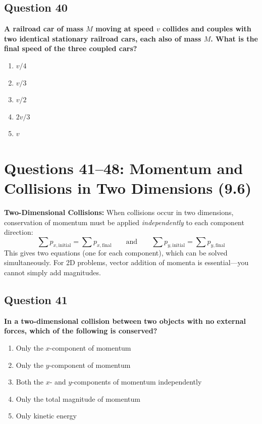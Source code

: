 \documentclass[12pt,letterpaper]{article}
\begin{document}
\subsection{Question 40}

\begin{questionbox}
\textbf{A railroad car of mass $M$ moving at speed $v$ collides and couples with two identical stationary railroad cars, each also of mass $M$. What is the final speed of the three coupled cars?}

\begin{enumerate}[label=\alph*)]
    \item $v/4$
    \item $v/3$
    \item $v/2$
    \item $2v/3$
    \item $v$
\end{enumerate}
\end{questionbox}

\section{Questions 41--48: Momentum and Collisions in Two Dimensions (9.6)}

\begin{conceptbox}
\textbf{Two-Dimensional Collisions:} When collisions occur in two dimensions, conservation of momentum must be applied \emph{independently} to each component direction:
\[
\sum p_{x,\text{initial}} = \sum p_{x,\text{final}} \qquad \text{and} \qquad \sum p_{y,\text{initial}} = \sum p_{y,\text{final}}
\]
This gives two equations (one for each component), which can be solved simultaneously. For 2D problems, vector addition of momenta is essential---you cannot simply add magnitudes.
\end{conceptbox}

\subsection{Question 41}

\begin{questionbox}
\textbf{In a two-dimensional collision between two objects with no external forces, which of the following is conserved?}

\begin{enumerate}[label=\alph*)]
    \item Only the $x$-component of momentum
    \item Only the $y$-component of momentum
    \item Both the $x$- and $y$-components of momentum independently
    \item Only the total magnitude of momentum
    \item Only kinetic energy
\end{enumerate}
\end{questionbox}
\end{document}
